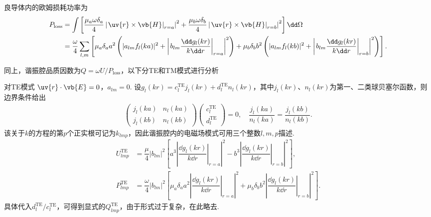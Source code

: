 良导体内的欧姆损耗功率为
\begin{align*}
	P_{\text{loss}} &= \int \left[ \dfrac{\mu_a \omega \delta_a}{4} \left| \left. \uv{r} \times \vb{H} \right|_{r=a} \right|^2 + \dfrac{\mu_b \omega \delta_b}{4} \left| \left. \uv{r} \times \vb{H} \right|_{r=b} \right|^2 \right] \dd \Omega \\
	&= \dfrac{\omega}{4} \sum_{l,m} \left[ \mu_a \delta_a a^2 \left( |a_{lm} f_l(ka)|^2 + \left| \left. b_{lm} \dfrac{\dd  g_l(kr)}{k \dd r} \right|_{r=a} \right|^2 \right) + \mu_b \delta_b b^2 \left( |a_{lm} f_l(kb)|^2 + \left| \left. b_{lm} \dfrac{\dd  g_l(kr)}{k \dd r} \right|_{r=b} \right|^2 \right) \right].
\end{align*}

同上，谐振腔品质因数为\(Q = \omega U/P_{\text{loss}}\)，以下分TE和TM模式进行分析


对TE模式
\(\uv{r} \cdot \vb{E} = 0\)，\(a_{lm} = 0\).
设\(g_l(kr) = c_l^{\text{TE}} j_l(kr) + d_l^{\text{TE}} n_l(kr)\)，其中\(j_l(kr)\)、\(n_l(kr)\)为第一、二类球贝塞尔函数，则边界条件给出
\begin{align*}
	\begin{pmatrix} j_l(ka) & n_l(ka) \\ j_l(kb) & n_l(kb) \end{pmatrix} \begin{pmatrix} c_l^{\text{TE}} \\ d_l^{\text{TE}} \end{pmatrix} = 0, \quad \dfrac{j_l(ka)}{n_l(ka)} = \dfrac{j_l(kb)}{n_l(kb)}.
\end{align*}
该关于\(k\)的方程的第\(p\)个正实根可记为\(k_{lmp}\)，因此谐振腔内的电磁场模式可用三个整数\(l, m, p\)描述.
\begin{align*}
	U_{lmp}^{\text{TE}} &= \dfrac{\mu}{4} |b_{lm}|^2 \left[ a^3 \left| \left. \dfrac{\dd  g_l(kr)}{k \dd r} \right|_{r=a} \right|^2 - b^3 \left| \left. \dfrac{\dd  g_l(kr)}{k \dd r} \right|_{r=b} \right|^2 \right],\\
	P_{lmp}^{\text{TE}} &= \dfrac{\omega}{4} |b_{lm}|^2 \left[ \mu_a \delta_a a^2 \left| \left. \dfrac{\dd  g_l(kr)}{k \dd r} \right|_{r=a} \right|^2 + \mu_b \delta_b b^2 \left| \left. \dfrac{\dd  g_l(kr)}{k \dd r} \right|_{r=b} \right|^2 \right].
\end{align*}
具体代入\(d_l^{\text{TE}}/c_l^{\text{TE}}\)，可得到显式的\(Q_{lmp}^{\text{TE}}\)，由于形式过于复杂，在此略去.

